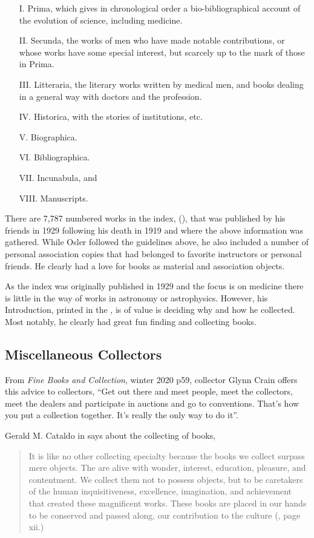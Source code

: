 \documentclass[letterpaper]{article}
\begin{document}
\begin{itemize}
\item[I.] Prima, which gives in chronological order a
  bio-bibliographical account of the evolution of science, including
  medicine.
\item[II.] Secunda, the works of men who have made notable
  contributions, or whose works have some special interest, but
  scarcely up to the mark of those in Prima.
\item[III.] Litteraria, the literary works written by medical men, and
  books dealing in a general way with doctors and the profession.
\item[IV.] Historica, with the stories of institutions, etc.
\item[V.] Biographica.
\item[VI.] Bibliographica.
\item[VII.] Incunabula, and
\item[VIII.] Manuscripts.
\end{itemize}

There are 7,787 numbered works in the index,  (\cite{Francis2000}), that was published by his friends
in 1929 following his death in 1919 and where the above information
was gathered.  While Osler followed the guidelines above, he also
included a number of personal association copies that had belonged to
favorite instructors or personal friends. He clearly had a love for
books as material and association objects.

As the index was originally published in 1929 and the focus is on
medicine there is little in the way of  works in astronomy or
astrophysics.  However, his Introduction, printed in the
, is of value is deciding why and how he
collected. Most notably, he clearly had great fun finding and
collecting books.


\subsection{Miscellaneous Collectors}

From {\itshape Fine Books and Collection}, winter 2020 p59, collector
Glynn Crain offers this advice to collectors, ``Get out there and meet
people, meet the collectors, meet the dealers and participate in
auctions and go to conventions. That's how you put a collection
together. It's really the only way to do it''.

Gerald M. Cataldo in  says about the
collecting of books,
\begin{quotation}
  It is like no other collecting specialty because the books we collect
  surpass mere objects. The are alive with wonder, interest, education,
  pleasure, and contentment. We collect them not to possess objects, but
  to be caretakers of the human inquisitiveness, excellence, imagination,
  and achievement that created these magnificent works. These books are
  placed in our hands to be conserved and passed along, our contribution
  to the culture (\cite{Cataldo2010}, page xii.)
\end{quotation}
\end{document}
